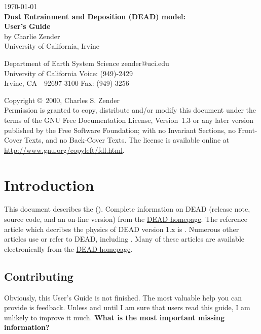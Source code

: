 \documentclass[12pt,twoside]{article}
\begin{document}

\begin{center}
\hfill \today\\
\bigskip
{\Large \textbf{Dust Entrainment and Deposition (DEAD) model:\\ 
User's Guide}}\\
\bigskip
by Charlie Zender\\
University of California, Irvine\\
\end{center}
Department of Earth System Science \hfill zender@uci.edu\\
University of California \hfill Voice: (949)-2429\\
Irvine, CA~~92697-3100 \hfill Fax: (949)-3256

\bigskip\noindent
Copyright \copyright\ 2000,  Charles S. Zender\\
Permission is granted to copy, distribute and/or modify this document
under the terms of the GNU Free Documentation License, Version~1.3
or any later version published by the Free Software Foundation;
with no Invariant Sections, no Front-Cover Texts, and no Back-Cover
Texts.
The license is available online at
\url{http://www.gnu.org/copyleft/fdl.html}.

\setcounter{page}{1}
\pagestyle{headings}
\thispagestyle{empty}
\tableofcontents
\listoftables
{}
\setcounter{page}{1}
\thispagestyle{empty}

\section{Introduction}\label{sxn:ntr}

This document describes the 
 ().
Complete information on DEAD (release note, source code, and an on-line version) 
from the \href{http://dust.ess.uci.edu/dead}{DEAD homepage}.  
The reference article which decribes the physics of DEAD version 1.x is 
\cite{ZBN03}.
Numerous other articles use or refer to DEAD, including 
\cite{CCR01,CRE01,RCE01,CRE02,GZC02,MZL02,BiZ03,LMZ03,LMD03,MLD03,MaL03,LMZ03,ZBN03,ZNT03,GrZ04,OMC04}.
Many of these articles are available electronically from the
\href{http://dust.ess.uci.edu/dead}{DEAD homepage}.

\subsection[Contributing]{Contributing}\label{sxn:cnt}
Obviously, this User's Guide is not finished.
The most valuable help you can provide is feedback.
Unless and until I am sure that users read this guide, I am unlikely
to improve it much.
\textbf{What is the most important missing information?}
\end{document}
